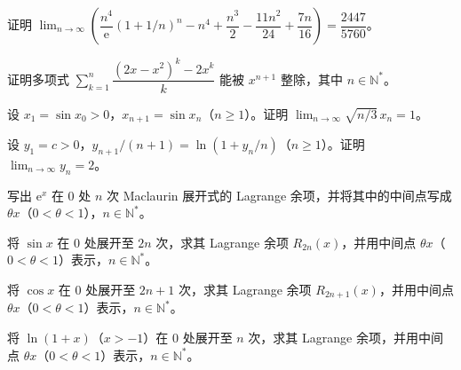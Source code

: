 \noindent\begin{minipage}{\textwidth}
证明 $\lim_{n\to\infty}\left(\dfrac{n^4}{\mathrm e}(1+1/n)^n-n^4+\dfrac{n^3}{2}-\dfrac{11n^2}{24}+\dfrac{7n}{16}\right)=\dfrac{2447}{5760}$。
\end{minipage}\par\vfill
\newpage
\noindent\begin{minipage}{\textwidth}
证明多项式 $\sum_{k=1}^n\dfrac{(2x-x^2)^k-2x^k}{k}$ 能被 $x^{n+1}$ 整除，其中 $n\in\mathbb N^*$。
\end{minipage}\par\vfill
\noindent\begin{minipage}{\textwidth}
设 $x_1=\sin x_0>0$，$x_{n+1}=\sin x_n$（$n\ge1$）。证明 $\lim_{n\to\infty}\sqrt{n/3}\,x_n=1$。
\end{minipage}\par\vfill
\noindent\begin{minipage}{\textwidth}
设 $y_1=c>0$，$y_{n+1}/(n+1)=\ln(1+y_n/n)$（$n\ge1$）。证明 $\lim_{n\to\infty}y_n=2$。
\end{minipage}\par\vfill
\newpage
\noindent\begin{minipage}{\textwidth}
写出 $\mathrm e^x$ 在 $0$ 处 $n$ 次 Maclaurin 展开式的 Lagrange 余项，并将其中的中间点写成 $\theta x$（$0<\theta<1$），$n\in\mathbb N^*$。
\end{minipage}\par\vfill
\noindent\begin{minipage}{\textwidth}
将 $\sin x$ 在 $0$ 处展开至 $2n$ 次，求其 Lagrange 余项 $R_{2n}(x)$，并用中间点 $\theta x$（$0<\theta<1$）表示，$n\in\mathbb N^*$。
\end{minipage}\par\vfill
\noindent\begin{minipage}{\textwidth}
将 $\cos x$ 在 $0$ 处展开至 $2n+1$ 次，求其 Lagrange 余项 $R_{2n+1}(x)$，并用中间点 $\theta x$（$0<\theta<1$）表示，$n\in\mathbb N^*$。
\end{minipage}\par\vfill
\newpage
\noindent\begin{minipage}{\textwidth}
将 $\ln(1+x)$（$x>-1$）在 $0$ 处展开至 $n$ 次，求其 Lagrange 余项，并用中间点 $\theta x$（$0<\theta<1$）表示，$n\in\mathbb N^*$。
\end{minipage}\par\vfill
